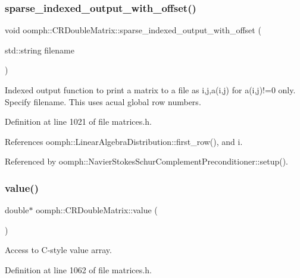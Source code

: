\subsubsection{\texorpdfstring{sparse\+\_\+indexed\+\_\+output\+\_\+with\+\_\+offset()}{sparse\_indexed\_output\_with\_offset()}}
{\footnotesize\ttfamily void oomph\+::\+C\+R\+Double\+Matrix\+::sparse\+\_\+indexed\+\_\+output\+\_\+with\+\_\+offset (\begin{DoxyParamCaption}\item[{std\+::string}]{filename }\end{DoxyParamCaption})\hspace{0.3cm}{\ttfamily [inline]}}



Indexed output function to print a matrix to a file as i,j,a(i,j) for a(i,j)!=0 only. Specify filename. This uses acual global row numbers. 



Definition at line 1021 of file matrices.\+h.



References oomph\+::\+Linear\+Algebra\+Distribution\+::first\+\_\+row(), and i.



Referenced by oomph\+::\+Navier\+Stokes\+Schur\+Complement\+Preconditioner\+::setup().

\mbox{\label{classoomph_1_1CRDoubleMatrix_ab8220b7c2bb763dab32a4d0fea7da6f4}} 
\subsubsection{\texorpdfstring{value()}{value()}\hspace{0.1cm}{\footnotesize\ttfamily [1/2]}}
{\footnotesize\ttfamily double$\ast$ oomph\+::\+C\+R\+Double\+Matrix\+::value (\begin{DoxyParamCaption}{ }\end{DoxyParamCaption})\hspace{0.3cm}{\ttfamily [inline]}}



Access to C-\/style value array. 



Definition at line 1062 of file matrices.\+h.



